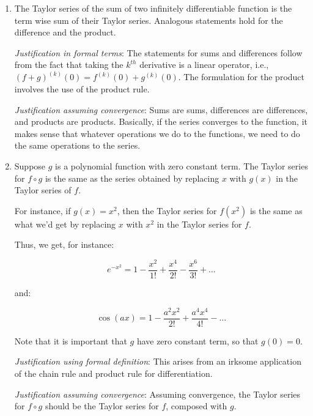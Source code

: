 \documentclass{amsart}
\begin{document}
\begin{enumerate}
  {\em Justification assuming convergence}: In this case, since the
  Taylor series converges to the function, differentiating the Taylor
  series is equivalent to differentiating the function. This isn't
  quite a complete and coherent argument, because we are
  differentiating an {\em infinite sum}, and we need to worry about
  additional convergence issues. But it gives the core reason.

\item The Taylor series of the sum of two infinitely differentiable
  function is the term wise sum of their Taylor series. Analogous
  statements hold for the difference and the product.

  {\em Justification in formal terms}: The statements for sums and
  differences follow from the fact that taking the $k^{th}$ derivative
  is a linear operator, i.e., $(f + g)^{(k)}(0) = f^{(k)}(0) + g^{(k)}(0)$.
  The formulation for the product involves the use of the product rule.

  {\em Justification assuming convergence}: Sums are sums, differences
  are differences, and products are products. Basically, if the series
  converges to the function, it makes sense that whatever operations
  we do to the functions, we need to do the same operations to the
  series.
\item Suppose $g$ is a polynomial function with zero constant
  term. The Taylor series for $f \circ g$ is the same as the series
  obtained by replacing $x$ with $g(x)$ in the Taylor series of $f$.

  For instance, if $g(x) = x^2$, then the Taylor series for $f(x^2)$
  is the same as what we'd get by replacing $x$ with $x^2$ in the
  Taylor series for $f$.

  Thus, we get, for instance:

  $$e^{-x^2} = 1 - \frac{x^2}{1!} + \frac{x^4}{2!} - \frac{x^6}{3!} + \dots$$

  and:

  $$\cos(ax) = 1 - \frac{a^2x^2}{2!} + \frac{a^4x^4}{4!} - \dots$$

  Note that it is important that $g$ have zero constant term, so that
  $g(0) = 0$.

  {\em Justification using formal definition}: This arises from an
  irksome application of the chain rule and product rule for
  differentiation.

  {\em Justification assuming convergence}: Assuming convergence, the
  Taylor series for $f \circ g$ should be the Taylor series for $f$,
  composed with $g$.
\end{enumerate}
\end{document}
